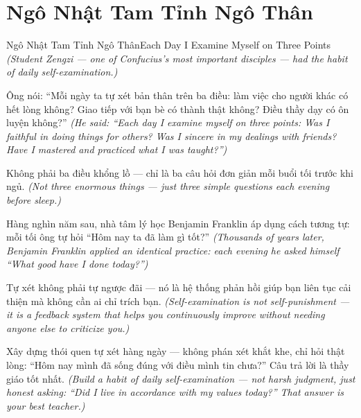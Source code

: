 \section{Ngô Nhật Tam Tỉnh Ngô Thân}
\begin{truyen}{Ngô Nhật Tam Tỉnh Ngô Thân}{Each Day I Examine Myself on Three Points}
\textit{(Student Zengzi — one of Confucius's most important disciples — had the habit of daily self-examination.)}

Ông nói: ``Mỗi ngày ta tự xét bản thân trên ba điều: làm việc cho người khác có hết lòng không? Giao tiếp với bạn bè có thành thật không? Điều thầy dạy có ôn luyện không?''
\textit{(He said: ``Each day I examine myself on three points: Was I faithful in doing things for others? Was I sincere in my dealings with friends? Have I mastered and practiced what I was taught?'')}

Không phải ba điều khổng lồ — chỉ là ba câu hỏi đơn giản mỗi buổi tối trước khi ngủ.
\textit{(Not three enormous things — just three simple questions each evening before sleep.)}

Hàng nghìn năm sau, nhà tâm lý học Benjamin Franklin áp dụng cách tương tự: mỗi tối ông tự hỏi ``Hôm nay ta đã làm gì tốt?''
\textit{(Thousands of years later, Benjamin Franklin applied an identical practice: each evening he asked himself ``What good have I done today?'')}

Tự xét không phải tự ngược đãi — nó là hệ thống phản hồi giúp bạn liên tục cải thiện mà không cần ai chỉ trích bạn.
\textit{(Self-examination is not self-punishment — it is a feedback system that helps you continuously improve without needing anyone else to criticize you.)}

\end{truyen}

\begin{baihoc}
Xây dựng thói quen tự xét hàng ngày — không phán xét khắt khe, chỉ hỏi thật lòng: ``Hôm nay mình đã sống đúng với điều mình tin chưa?'' Câu trả lời là thầy giáo tốt nhất.
\textit{(Build a habit of daily self-examination — not harsh judgment, just honest asking: ``Did I live in accordance with my values today?'' That answer is your best teacher.)}
\end{baihoc}
\ngancach

